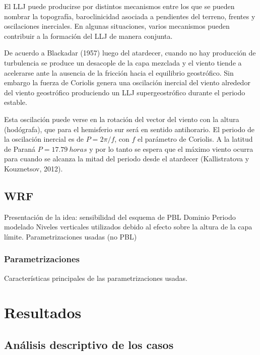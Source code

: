 \documentclass[12pt,spanish,oneside]{book}
\begin{document}
El LLJ puede producirse por distintos mecanismos entre los que se pueden
nombrar la topografía, baroclinicidad asociada a pendientes del terreno,
frentes y oscilaciones inerciales. En algunas situaciones, varios
mecanismos pueden contribuir a la formación del LLJ de manera conjunta.

De acuerdo a Blackadar (1957) luego del atardecer, cuando no hay
producción de turbulencia se produce un desacople de la capa mezclada y
el viento tiende a acelerarse ante la ausencia de la fricción hacia el
equilibrio geostrófico. Sin embargo la fuerza de Coriolis genera una
oscilación inercial del viento alrededor del viento geostrófico
produciendo un LLJ supergeostrófico durante el periodo estable.

Esta oscilación puede verse en la rotación del vector del viento con la
altura (hodógrafa), que para el hemisferio sur será en sentido
antihorario. El periodo de la oscilación inercial es de \(P = 2\pi/f\),
con \(f\) el parámetro de Coriolis. A la latitud de Paraná
\(P = 17.79 \: horas\) y por lo tanto se espera que el máximo viento
ocurra para cuando se alcanza la mitad del periodo desde el atardecer
(Kallistratova y Kouznetsov, 2012).

\section{WRF}\label{wrf}

Presentación de la idea: sensibilidad del esquema de PBL Dominio Periodo
modelado Niveles verticales utilizados debido al efecto sobre la altura
de la capa límite. Parametrizaciones usadas (no PBL)

\subsection{Parametrizaciones}\label{parametrizaciones}

Características principales de las parametrizaciones usadas.

\chapter{Resultados}\label{resultados}

\section{Análisis descriptivo de los
casos}\label{analisis-descriptivo-de-los-casos}
\end{document}
